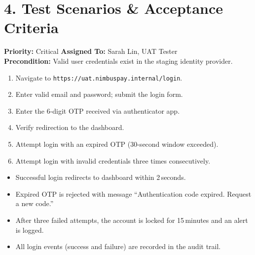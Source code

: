 \section*{\color{primaryNavy}4. Test Scenarios \& Acceptance Criteria}
\sectionline

\begin{tcolorbox}[
  enhanced,
  colback=white,
  colframe=accentBlue,
  boxrule=1pt,
  left=12pt,
  right=12pt,
  top=10pt,
  bottom=10pt,
  sharp corners,
  title={\textbf{TC-001: User Login \& Multi-Factor Authentication}},
  fonttitle=\bfseries\color{white},
  colbacktitle=accentBlue
]
  \textbf{Priority:} Critical \hfill \textbf{Assigned To:} Sarah Lin, UAT Tester\\[4pt]
  \textbf{Precondition:} Valid user credentials exist in the staging identity provider.\\[4pt]

  \begin{tcolorbox}[
    enhanced,
    colback=bgLight,
    colframe=borderGray,
    boxrule=0.5pt,
    left=10pt,
    right=10pt,
    top=6pt,
    bottom=6pt,
    sharp corners,
    title={Test Steps},
    fonttitle=\bfseries\color{primaryNavy}
  ]
    \begin{enumerate}[nosep, leftmargin=*]
      \item Navigate to \texttt{https://uat.nimbuspay.internal/login}.
      \item Enter valid email and password; submit the login form.
      \item Enter the 6-digit OTP received via authenticator app.
      \item Verify redirection to the dashboard.
      \item Attempt login with an expired OTP (30-second window exceeded).
      \item Attempt login with invalid credentials three times consecutively.
    \end{enumerate}
  \end{tcolorbox}

  \vspace{4pt}

  \begin{tcolorbox}[
    enhanced,
    colback=bgLight,
    colframe=statusPass,
    boxrule=0.5pt,
    left=10pt,
    right=10pt,
    top=6pt,
    bottom=6pt,
    sharp corners,
    title={\passmark\ Acceptance Criteria},
    fonttitle=\bfseries\color{statusPass}
  ]
    \begin{itemize}[nosep, leftmargin=*]
      \item Successful login redirects to dashboard within 2\,seconds.
      \item Expired OTP is rejected with message ``Authentication code expired. Request a new code.''
      \item After three failed attempts, the account is locked for 15\,minutes and an alert is logged.
      \item All login events (success and failure) are recorded in the audit trail.
    \end{itemize}
  \end{tcolorbox}
\end{tcolorbox}

